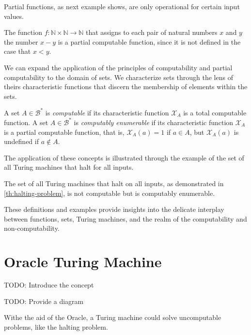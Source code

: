 Partial functions, as next example shows, are only operational for certain input values. 

\begin{example}
The function $f: \mathbb{N} \times \mathbb{N} \rightarrow \mathbb{N}$ that assigns to each pair of natural numbers $x$ and $y$ the number $x - y$ is a partial computable function, since it is not defined in the case that $x < y$.
\end{example}

We can expand the application of the principles of computability and partial computability to the domain of sets. We characterize sets through the lens of theirs characteristic functions that discern the membership of elements within the sets.

\begin{definition}
A set $A \in \mathcal{B}^\ast$ is \emph{computable} if its characteristic function $\mathcal{X}_A$ is a total computable function. A set $A \in \mathcal{B}^\ast$ is \emph{computably enumerable} if its characteristic function $\mathcal{X}_A$ is a partial computable function, that is, $\mathcal{X}_A(a) = 1$ if $a \in A$, but $\mathcal{X}_A(a)$ is undefined if $a \not\in A$.
\end{definition}

The application of these concepts is illustrated through the example of the set of all Turing machines that halt for all inputs.

\begin{example}
The set of all Turing machines that halt on all inputs, as demonstrated in \ref{th:halting-problem}, is not computable but is computably enumerable.
\end{example}

These definitions and examples provide insights into the delicate interplay between functions, sets, Turing machines, and the realm of the computability and non-computability.

%
%

\section{Oracle Turing Machine}
\label{sec:oracle_turing_machine}

{\color{red} TODO: Introduce the concept}

{\color{red} TODO: Provide a diagram}

Withe the aid of the Oracle, a Turing machine could solve uncomputable problems, like the halting problem.

